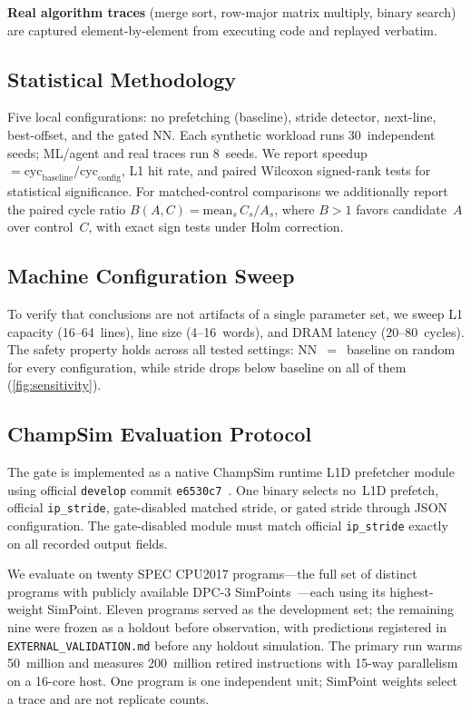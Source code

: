 \documentclass[sigplan,anonymous,review,nonacm]{acmart}
\begin{document}
\textbf{Real algorithm traces} (merge sort, row-major matrix multiply,
binary search) are captured element-by-element from executing code and
replayed verbatim.

\subsection{Statistical Methodology}

Five local configurations: no prefetching (baseline), stride detector,
next-line, best-offset, and the gated NN. Each synthetic workload runs
30~independent seeds; ML/agent and real traces run 8~seeds. We report
speedup $= \text{cyc}_\text{baseline} / \text{cyc}_\text{config}$, L1 hit
rate, and paired Wilcoxon signed-rank tests for statistical significance.
For matched-control comparisons we additionally report the paired cycle
ratio $B(A, C) = \text{mean}_s\, C_s / A_s$, where $B > 1$ favors
candidate~$A$ over control~$C$, with exact sign tests under Holm
correction.

\subsection{Machine Configuration Sweep}

To verify that conclusions are not artifacts of a single parameter set, we
sweep L1 capacity (16--64~lines), line size (4--16~words), and DRAM latency
(20--80~cycles). The safety property holds across all tested settings:
NN~$=$~baseline on random for every configuration, while stride drops below
baseline on all of them (\cref{fig:sensitivity}).

\subsection{ChampSim Evaluation Protocol}
\label{sec:champsim_protocol}

The gate is implemented as a native ChampSim runtime L1D prefetcher module
using official \texttt{develop} commit \texttt{e6530c7}~\cite{champsim}.
One binary selects no~L1D prefetch, official \texttt{ip\_stride},
gate-disabled matched stride, or gated stride through JSON configuration.
The gate-disabled module must match official \texttt{ip\_stride} exactly on
all recorded output fields.

We evaluate on twenty SPEC CPU2017 programs---the full set of distinct
programs with publicly available DPC-3 SimPoints~\cite{dpc3}---each using
its highest-weight SimPoint. Eleven programs served as the development set;
the remaining nine were frozen as a holdout before observation, with
predictions registered in \texttt{EXTERNAL\_VALIDATION.md} before any
holdout simulation. The primary run warms 50~million and measures
200~million retired instructions with 15-way parallelism on a 16-core host.
One program is one independent unit; SimPoint weights select a trace and are
not replicate counts.
\end{document}
